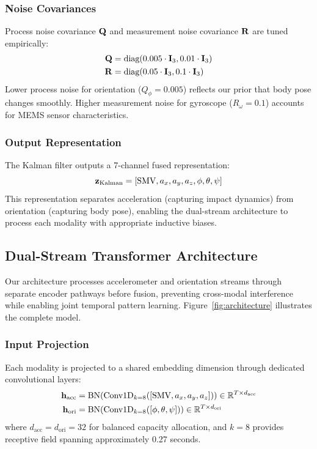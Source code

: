 \subsubsection{Noise Covariances}
Process noise covariance $\mathbf{Q}$ and measurement noise covariance $\mathbf{R}$ are tuned empirically:
\begin{align}
\mathbf{Q} &= \text{diag}(0.005 \cdot \mathbf{I}_3, 0.01 \cdot \mathbf{I}_3) \\
\mathbf{R} &= \text{diag}(0.05 \cdot \mathbf{I}_3, 0.1 \cdot \mathbf{I}_3)
\end{align}
Lower process noise for orientation ($Q_\phi = 0.005$) reflects our prior that body pose changes smoothly. Higher measurement noise for gyroscope ($R_\omega = 0.1$) accounts for MEMS sensor characteristics.

\subsubsection{Output Representation}
The Kalman filter outputs a 7-channel fused representation:
\begin{equation}
\mathbf{z}_\text{Kalman} = [\text{SMV}, a_x, a_y, a_z, \phi, \theta, \psi]
\end{equation}
This representation separates acceleration (capturing impact dynamics) from orientation (capturing body pose), enabling the dual-stream architecture to process each modality with appropriate inductive biases.

\subsection{Dual-Stream Transformer Architecture}
\label{subsec:architecture}

Our architecture processes accelerometer and orientation streams through separate encoder pathways before fusion, preventing cross-modal interference while enabling joint temporal pattern learning. Figure~\ref{fig:architecture} illustrates the complete model.

\subsubsection{Input Projection}
Each modality is projected to a shared embedding dimension through dedicated convolutional layers:
\begin{align}
\mathbf{h}_\text{acc} &= \text{BN}(\text{Conv1D}_{k=8}([\text{SMV}, a_x, a_y, a_z])) \in \mathbb{R}^{T \times d_\text{acc}} \\
\mathbf{h}_\text{ori} &= \text{BN}(\text{Conv1D}_{k=8}([\phi, \theta, \psi])) \in \mathbb{R}^{T \times d_\text{ori}}
\end{align}
where $d_\text{acc} = d_\text{ori} = 32$ for balanced capacity allocation, and $k=8$ provides receptive field spanning approximately 0.27 seconds.

